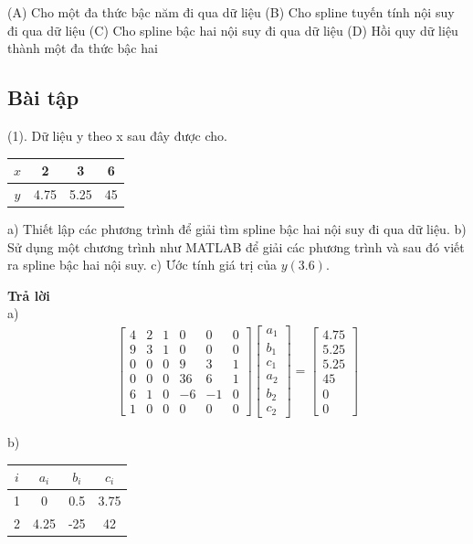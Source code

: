 (A) Cho một đa thức bậc năm đi qua dữ liệu
(B) Cho spline tuyến tính nội suy đi qua dữ liệu
(C) Cho spline bậc hai nội suy đi qua dữ liệu
(D) Hồi quy dữ liệu thành một đa thức bậc hai

\subsection{Bài tập}

(1). Dữ liệu y theo x sau đây được cho.
\begin{table}[h]
\centering
\begin{tabular}{|c|c|c|c|}
\hline
$x$ & 2 & 3 & 6 \\
\hline
$y$ & 4.75 & 5.25 & 45 \\
\hline
\end{tabular}
\end{table}

a) Thiết lập các phương trình để giải tìm spline bậc hai nội suy đi qua dữ liệu.
b) Sử dụng một chương trình như MATLAB để giải các phương trình và sau đó viết ra spline bậc hai nội suy.
c) Ước tính giá trị của $y(3.6)$.

\textbf{Trả lời} \\
a)
\begin{align*}
\begin{bmatrix}
4 & 2 & 1 & 0 & 0 & 0 \\
9 & 3 & 1 & 0 & 0 & 0 \\
0 & 0 & 0 & 9 & 3 & 1 \\
0 & 0 & 0 & 36 & 6 & 1 \\
6 & 1 & 0 & -6 & -1 & 0 \\
1 & 0 & 0 & 0 & 0 & 0
\end{bmatrix}
\begin{bmatrix}
a_1 \\ b_1 \\ c_1 \\ a_2 \\ b_2 \\ c_2
\end{bmatrix}
=
\begin{bmatrix}
4.75 \\ 5.25 \\ 5.25 \\ 45 \\ 0 \\ 0
\end{bmatrix}
\end{align*}

b)
\begin{table}[h]
\centering
\begin{tabular}{|c|c|c|c|}
\hline
$i$ & $a_i$ & $b_i$ & $c_i$ \\
\hline
1 & 0 & 0.5 & 3.75 \\
2 & 4.25 & -25 & 42 \\
\hline
\end{tabular}
\end{table}

